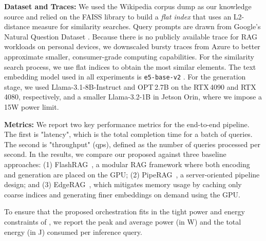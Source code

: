 \noindent\textbf{Dataset and Traces:} We used the Wikipedia corpus dump \cite{wikipedia_corpus_dump} as our knowledge source and relied on the FAISS library \cite{faiss} to build a \emph{flat index} that uses an L2-distance measure for \topk similarity searches. Query prompts are drawn from Google’s Natural Question Dataset \cite{natural_questions}. Because there is no publicly available trace for RAG workloads on personal devices, we downscaled bursty traces from Azure to better approximate smaller, consumer-grade computing capabilities. For the similarity search process, we use flat indices to obtain the \topk most similar elements. The text embedding model used in all experiments is \texttt{e5-base-v2} \cite{e5_base_v2}. For the generation stage, we used Llama-3.1-8B-Instruct \cite{llama_3_1_8b_instruct} and OPT\,2.7B \cite{opt} on the RTX\,4090 and RTX\,4080, respectively, and a smaller Llama-3.2-1B \cite{llama3_2_1b} in Jetson Orin, where we impose a 15W power limit.

\noindent\textbf{Metrics:} We report two key performance metrics for the end-to-end pipeline. The first is "latency", which is the total completion time for a batch of queries. The second is "throughput" (qps), defined as the number of queries processed per second. In the results, we compare our proposed \design{} against three baseline approaches: (1) FlashRAG~\cite{jin2024flashrag}, a modular RAG framework where both encoding and generation are placed on the GPU; (2) PipeRAG~\cite{jiang2024piperag}, a server-oriented pipeline design; and (3) EdgeRAG~\cite{EdgeRAG}, which mitigates memory usage by caching only coarse indices and generating finer embeddings on demand using the GPU.

To ensure that the proposed orchestration fits in the tight power and energy constraints of , we report the peak and average power (in W) and the total energy (in J) consumed per inference query.

